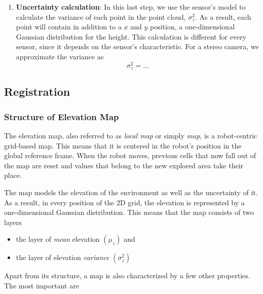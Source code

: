 \begin{enumerate}
    \item \textbf{Uncertainty calculation}:
        In this last step, we use the sensor's model to calculate the variance
        of each point in the point cloud, $\sigma^2_z$.
        As a result, each point will contain in addition to a $x$ and $y$
        position, a one-dimensional Gaussian distribution for the height.
        This calculation is different for every sensor, since it depends
        on the sensor's characteristic.
        For a stereo camera, we approximate the variance as
        \begin{equation}
            \sigma^2_z = \dots
        \end{equation}
\end{enumerate}


\subsection{Registration}

\subsubsection{Structure of Elevation Map} \label{map_structure}

The elevation map, also referred to as \textit{local map} or simply
\textit{map}, is a robot-centric grid-based map.
This means that it is centered in the robot's position in the
global reference frame.
When the robot moves, previous cells that now fall out of the map are
reset and values that belong to the new explored area take their place.

The map models the elevation of the environment as well as the uncertainty
of it.
As a result, in every position of the 2D grid, the elevation is
represented by a one-dimensional Gaussian distribution.
This means that the map consists of two layers

\begin{itemize}
    \item the layer of \textit{mean} elevation $(\mu_z)$ and
    \item the layer of elevation \textit{variance} $(\sigma^2_z)$
\end{itemize}

Apart from its structure, a map is also characterized by a few other
properties.
The most important are

